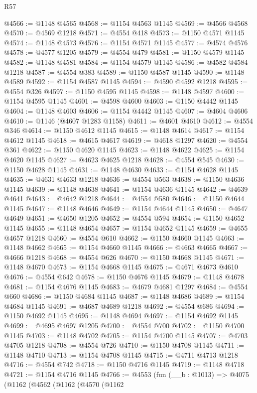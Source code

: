 \begin{lexlean}{R57}
\begin{coremodule}
@4566 := @1148 @4565
@4568 := @1154 @4563 @1145
@4569 := @4566 @4568
@4570 := @4569 @1218
@4571 := @4554 @418
@4573 := @1150 @4571 @1145
@4574 := @1148 @4573
@4576 := @1154 @4571 @1145
@4577 := @4574 @4576
@4578 := @4577 @1205
@4579 := @4554 @479
@4581 := @1150 @4579 @1145
@4582 := @1148 @4581
@4584 := @1154 @4579 @1145
@4586 := @4582 @4584 @1218
@4587 := @4554 @383
@4589 := @1150 @4587 @1145
@4590 := @1148 @4589
@4592 := @1154 @4587 @1145
@4594 := @4590 @4592 @1218
@4595 := @4554 @326
@4597 := @1150 @4595 @1145
@4598 := @1148 @4597
@4600 := @1154 @4595 @1145
@4601 := @4598 @4600
@4603 := @1150 @4442 @1145
@4604 := @1148 @4603
@4606 := @1154 @4442 @1145
@4607 := @4604 @4606
@4610 := @1146 (@4607 @1283 @1158)
@4611 := @4601 @4610
@4612 := @4554 @346
@4614 := @1150 @4612 @1145
@4615 := @1148 @4614
@4617 := @1154 @4612 @1145
@4618 := @4615 @4617
@4619 := @4618 @1297
@4620 := @4554 @361
@4622 := @1150 @4620 @1145
@4623 := @1148 @4622
@4625 := @1154 @4620 @1145
@4627 := @4623 @4625 @1218
@4628 := @4554 @545
@4630 := @1150 @4628 @1145
@4631 := @1148 @4630
@4633 := @1154 @4628 @1145
@4635 := @4631 @4633 @1218
@4636 := @4554 @563
@4638 := @1150 @4636 @1145
@4639 := @1148 @4638
@4641 := @1154 @4636 @1145
@4642 := @4639 @4641
@4643 := @4642 @1218
@4644 := @4554 @580
@4646 := @1150 @4644 @1145
@4647 := @1148 @4646
@4649 := @1154 @4644 @1145
@4650 := @4647 @4649
@4651 := @4650 @1205
@4652 := @4554 @594
@4654 := @1150 @4652 @1145
@4655 := @1148 @4654
@4657 := @1154 @4652 @1145
@4659 := @4655 @4657 @1218
@4660 := @4554 @610
@4662 := @1150 @4660 @1145
@4663 := @1148 @4662
@4665 := @1154 @4660 @1145
@4666 := @4663 @4665
@4667 := @4666 @1218
@4668 := @4554 @626
@4670 := @1150 @4668 @1145
@4671 := @1148 @4670
@4673 := @1154 @4668 @1145
@4675 := @4671 @4673 @4610
@4676 := @4554 @642
@4678 := @1150 @4676 @1145
@4679 := @1148 @4678
@4681 := @1154 @4676 @1145
@4683 := @4679 @4681 @1297
@4684 := @4554 @660
@4686 := @1150 @4684 @1145
@4687 := @1148 @4686
@4689 := @1154 @4684 @1145
@4691 := @4687 @4689 @1218
@4692 := @4554 @686
@4694 := @1150 @4692 @1145
@4695 := @1148 @4694
@4697 := @1154 @4692 @1145
@4699 := @4695 @4697 @1205
@4700 := @4554 @700
@4702 := @1150 @4700 @1145
@4703 := @1148 @4702
@4705 := @1154 @4700 @1145
@4707 := @4703 @4705 @1218
@4708 := @4554 @726
@4710 := @1150 @4708 @1145
@4711 := @1148 @4710
@4713 := @1154 @4708 @1145
@4715 := @4711 @4713 @1218
@4716 := @4554 @742
@4718 := @1150 @4716 @1145
@4719 := @1148 @4718
@4721 := @1154 @4716 @1145
@4766 := @4553
    (fun (__b : @1013) =>
    @4075
      (@1162
        (@4562
          (@1162
            (@4570
              (@1162

\end{coremodule}
\end{lexlean}
